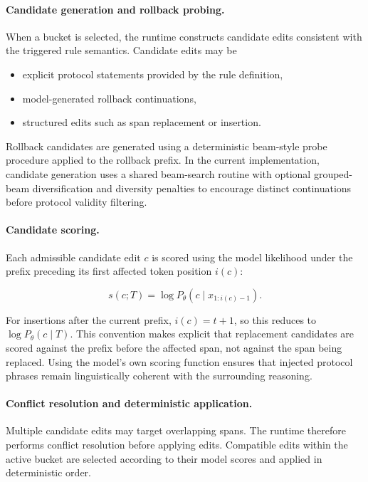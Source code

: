 \documentclass[twocolumn]{article}
\begin{document}
\paragraph{Candidate generation and rollback probing.}

When a bucket is selected, the runtime constructs candidate edits consistent
with the triggered rule semantics. Candidate edits may be

\begin{itemize}
  \item explicit protocol statements provided by the rule definition,
  \item model-generated rollback continuations,
  \item structured edits such as span replacement or insertion.
\end{itemize}

Rollback candidates are generated using a deterministic beam-style probe
procedure applied to the rollback prefix. In the current implementation,
candidate generation uses a shared beam-search routine with optional
grouped-beam diversification and diversity penalties to encourage distinct
continuations before protocol validity filtering.

\paragraph{Candidate scoring.}

Each admissible candidate edit $c$ is scored using the model likelihood under the
prefix preceding its first affected token position $i(c)$:

\[
  s(c;T)=\log P_\theta(c\mid x_{1:i(c)-1}).
\]

For insertions after the current prefix, $i(c)=t+1$, so this reduces to
$\log P_\theta(c\mid T)$. This convention makes explicit that replacement
candidates are scored against the prefix before the affected span, not against
the span being replaced. Using
the model's own scoring function ensures that injected protocol phrases remain
linguistically coherent with the surrounding reasoning.

\paragraph{Conflict resolution and deterministic application.}

Multiple candidate edits may target overlapping spans. The runtime therefore
performs conflict resolution before applying edits. Compatible edits within the
active bucket are selected according to their model scores and applied in
deterministic order.
\end{document}
